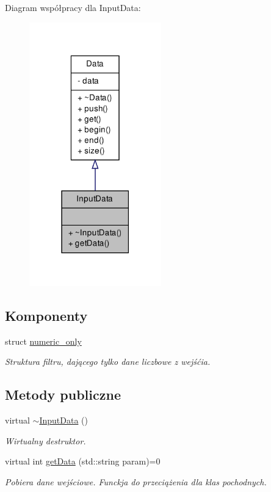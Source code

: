 \-Diagram współpracy dla \-Input\-Data\-:\nopagebreak
\begin{figure}[H]
\begin{center}
\leavevmode
\includegraphics[width=162pt]{class_input_data__coll__graph}
\end{center}
\end{figure}
\subsection*{\-Komponenty}
\begin{DoxyCompactItemize}
\item 
struct \hyperlink{struct_input_data_1_1numeric__only}{numeric\-\_\-only}
\begin{DoxyCompactList}\small\item\em \-Struktura filtru, dającego tylko dane liczbowe z wejśćia. \end{DoxyCompactList}\end{DoxyCompactItemize}
\subsection*{\-Metody publiczne}
\begin{DoxyCompactItemize}
\item 
virtual \hyperlink{class_input_data_ad432671747badda796cb035e8ca1e9c2}{$\sim$\-Input\-Data} ()
\begin{DoxyCompactList}\small\item\em \-Wirtualny destruktor. \end{DoxyCompactList}\item 
virtual int \hyperlink{class_input_data_ae1d8f8a2a2a7f7d4c4d3595ed767ef3d}{get\-Data} (std\-::string param)=0
\begin{DoxyCompactList}\small\item\em \-Pobiera dane wejściowe. \-Funckja do przeciążenia dla klas pochodnych. \end{DoxyCompactList}\end{DoxyCompactItemize}


